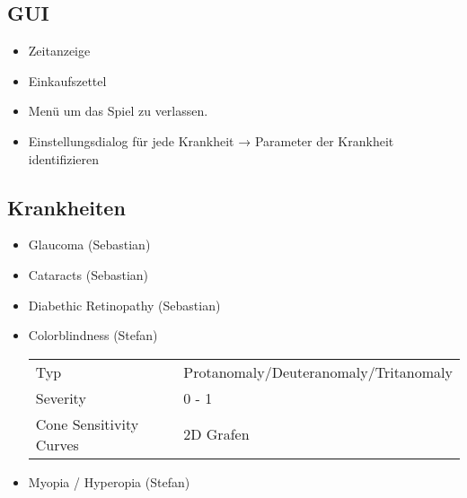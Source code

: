 ﻿\documentclass[a4paper, 11pt]{scrartcl}
\newcommand{\entwickler}[1]{\textcolor{BurntOrange}{(#1)}}
\newcommand{\Stefan}{\entwickler{Stefan}}
\newcommand{\Sebastian}{\entwickler{Sebastian}}
\begin{document}
\subsection{GUI}
\begin{itemize}
    \item Zeitanzeige
    \item Einkaufszettel
    \item Menü um das Spiel zu verlassen.
    \item Einstellungsdialog für jede Krankheit → Parameter der Krankheit
    identifizieren
\end{itemize}


\subsection{Krankheiten}
\begin{itemize}
    \item Glaucoma \Sebastian \\
    \item Cataracts \Sebastian \\
    \item Diabethic Retinopathy \Sebastian \\
    \item Colorblindness \Stefan \\
    \begin{tabular}{ll}
        Typ & Protanomaly/Deuteranomaly/Tritanomaly \\
        Severity & 0 - 1 \\
        Cone Sensitivity Curves & 2D Grafen \\
    \end{tabular}
    \item Myopia / Hyperopia \Stefan \\
\end{itemize}
\end{document}
